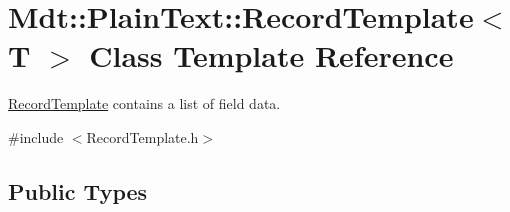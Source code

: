 \hypertarget{class_mdt_1_1_plain_text_1_1_record_template}{}\section{Mdt\+:\+:Plain\+Text\+:\+:Record\+Template$<$ T $>$ Class Template Reference}
\label{class_mdt_1_1_plain_text_1_1_record_template}


\hyperlink{class_mdt_1_1_plain_text_1_1_record_template}{Record\+Template} contains a list of field data.  




{\ttfamily \#include $<$Record\+Template.\+h$>$}

\subsection*{Public Types}
